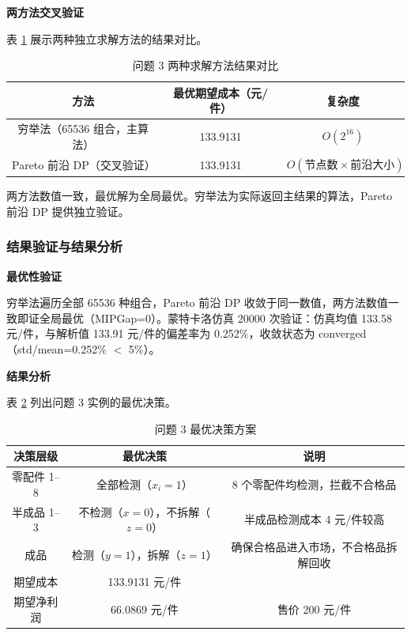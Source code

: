 \documentclass[12pt,a4paper]{ctexart}
\begin{document}
\textbf{两方法交叉验证}

表 \ref{tab:q3_valid} 展示两种独立求解方法的结果对比。

\begin{table}[H]
\centering
\caption{问题 3 两种求解方法结果对比}
\label{tab:q3_valid}
\begin{tabular}{ccc}
\toprule
方法 & 最优期望成本（元/件） & 复杂度 \\
\midrule
穷举法（65536 组合，主算法） & 133.9131 & $O(2^{16})$ \\
Pareto 前沿 DP（交叉验证） & 133.9131 & $O(\text{节点数}\times\text{前沿大小})$ \\
\bottomrule
\end{tabular}
\end{table}

两方法数值一致，最优解为全局最优。穷举法为实际返回主结果的算法，Pareto 前沿 DP 提供独立验证。

\subsubsection{结果验证与结果分析}

\textbf{最优性验证}

穷举法遍历全部 65536 种组合，Pareto 前沿 DP 收敛于同一数值，两方法数值一致即证全局最优（MIPGap=0）。蒙特卡洛仿真 20000 次验证：仿真均值 133.58 元/件，与解析值 133.91 元/件的偏差率为 0.252\%，收敛状态为 converged（std/mean=0.252\% $<$ 5\%）。

\textbf{结果分析}

表 \ref{tab:q3_results} 列出问题 3 实例的最优决策。

\begin{table}[H]
\centering
\caption{问题 3 最优决策方案}
\label{tab:q3_results}
\begin{tabular}{ccc}
\toprule
决策层级 & 最优决策 & 说明 \\
\midrule
零配件 1--8 & 全部检测（$x_i=1$） & 8 个零配件均检测，拦截不合格品 \\
半成品 1--3 & 不检测（$x=0$），不拆解（$z=0$） & 半成品检测成本 4 元/件较高 \\
成品 & 检测（$y=1$），拆解（$z=1$） & 确保合格品进入市场，不合格品拆解回收 \\
\midrule
期望成本 & 133.9131 元/件 & \\
期望净利润 & 66.0869 元/件 & 售价 200 元/件 \\
\bottomrule
\end{tabular}
\end{table}
\end{document}
